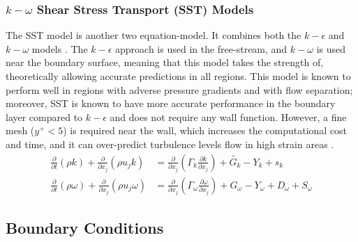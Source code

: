 \subsubsection{$k-\omega$ Shear Stress Transport (SST) Models}
The SST model is another two equation-model. It combines both the $k-\epsilon$ and $k-\omega$ models \cite{Andersson2011Turbulent-flowModelling}\cite{Ansys2006ModelingFlows}.  The $k-\epsilon$ approach is used in the free-stream, and $k-\omega$ is used near the boundary surface, meaning that this model takes the strength of, theoretically allowing accurate predictions in all regions. This model is known to perform well in regions with adverse pressure gradients and with flow separation; moreover, SST is known to have more accurate performance in the boundary layer compared to $k-\epsilon$ and does not require any wall function\cite{Andersson2011Turbulent-flowModelling}. However, a fine mesh ($y^+  < 5$) is required near the wall, which increases the computational cost and time, and it can over-predict turbulence levels flow in high strain areas \cite{Andersson2011Turbulent-flowModelling}\cite{Ansys2006ModelingFlows}. \begin{align}
\frac{\partial }{\partial t}({\rho} k)+\frac{\partial}{\partial x_j}({\rho} {u}_j k) & = \frac{\partial}{\partial x_j} (\Gamma_{k} \frac{\partial k}{\partial x_j}) + \tilde{G_k} - Y_k +s_k \\
\frac{\partial}{\partial t}(\rho \omega)+\frac{\partial}{\partial x_j}({\rho} {u}_j \omega) & = \frac{\partial}{\partial x_j}(\Gamma_\omega \frac{\partial \omega}{\partial x_j}) + G_\omega - Y_\omega + D_\omega + S_\omega
\end{align} 

\subsection{Boundary Conditions}

